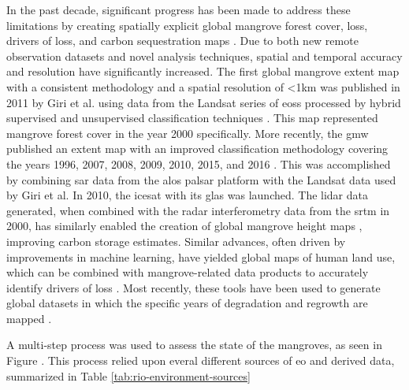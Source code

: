 In the past decade, significant progress has been made to address these limitations by creating spatially explicit global mangrove forest cover, loss, drivers of loss, and carbon sequestration maps \cite{spaldingWorldAtlasMangroves2010, donatoMangrovesMostCarbonrich2011, sandermanGlobalMapMangrove2018, simardMangroveCanopyHeight2019, goldbergGlobalDeclinesHuman2020}. Due to both new remote observation datasets and novel analysis techniques,   spatial and temporal accuracy and resolution have significantly increased. The first global mangrove extent map with a consistent methodology and a spatial resolution of <1km was published in 2011 by Giri et al. using data from the Landsat series of \acp{eos} processed by hybrid supervised and unsupervised classification techniques \cite{giriStatusDistributionMangrove2011}. This map represented mangrove forest cover in the year 2000 specifically. More recently, the \ac{gmw} published an extent map with an improved classification methodology covering the years 1996, 2007, 2008, 2009, 2010, 2015, and 2016 \cite{buntingGlobalMangroveWatch2018}. This was accomplished by combining \ac{sar} data from the \ac{alos} \ac{palsar} platform with the Landsat data used by Giri et al. In 2010, the \ac{icesat} with its \ac{glas} was launched. The lidar data generated, when combined with the radar interferometry data from the \ac{srtm} in 2000, has similarly enabled the creation of global mangrove height maps \cite{simardMangroveCanopyHeight2019}, improving carbon storage estimates. Similar advances, often driven by improvements in machine learning, have yielded global maps of human land use, which can be combined with mangrove-related data products to accurately identify drivers of loss \cite{goldbergGlobalDeclinesHuman2020}. Most recently, these tools have been used to generate global datasets in which the specific years of degradation and regrowth are mapped \cite{vancutsemLongterm199020192021}.

A multi-step process was used to assess the state of the mangroves, as seen in Figure . This process relied upon everal different sources of \ac{eo} and derived data, summarized in Table \ref{tab:rio-environment-sources}

